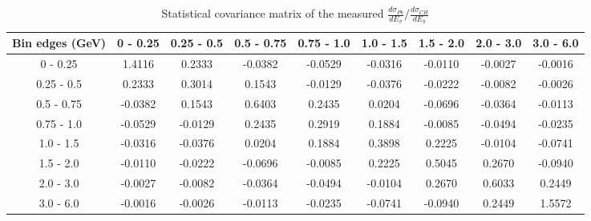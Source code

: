 \documentclass[aps,prl,twocolumn,superscriptaddress,nofootinbib]{revtex4-1}
\begin{document}
\begin{table}[h!]
  \centering
  \caption{Statistical covariance matrix of the measured $\frac{d\sigma_{Pb}}{dE_{\pi}}/\frac{d\sigma_{CH}}{dE_{\pi}}$}
    \begin{tabular}{c||cccccccc}
      Bin edges (GeV) & 0 - 0.25 & 0.25 - 0.5 & 0.5 - 0.75 & 0.75 - 1.0 & 1.0 - 1.5 & 1.5 - 2.0 & 2.0 - 3.0 & 3.0 - 6.0 \\
\hline \hline
        0 - 0.25 &  1.4116 &  0.2333 & -0.0382 & -0.0529 & -0.0316 & -0.0110 & -0.0027 & -0.0016 \\
      0.25 - 0.5 &  0.2333 &  0.3014 &  0.1543 & -0.0129 & -0.0376 & -0.0222 & -0.0082 & -0.0026 \\
      0.5 - 0.75 & -0.0382 &  0.1543 &  0.6403 &  0.2435 &  0.0204 & -0.0696 & -0.0364 & -0.0113 \\
      0.75 - 1.0 & -0.0529 & -0.0129 &  0.2435 &  0.2919 &  0.1884 & -0.0085 & -0.0494 & -0.0235 \\
       1.0 - 1.5 & -0.0316 & -0.0376 &  0.0204 &  0.1884 &  0.3898 &  0.2225 & -0.0104 & -0.0741 \\
       1.5 - 2.0 & -0.0110 & -0.0222 & -0.0696 & -0.0085 &  0.2225 &  0.5045 &  0.2670 & -0.0940 \\
       2.0 - 3.0 & -0.0027 & -0.0082 & -0.0364 & -0.0494 & -0.0104 &  0.2670 &  0.6033 &  0.2449 \\
       3.0 - 6.0 & -0.0016 & -0.0026 & -0.0113 & -0.0235 & -0.0741 & -0.0940 &  0.2449 &  1.5572 \\
    \end{tabular}
  \label{tablecov:Pb_Statistical_Epi}
\end{table}
\end{document}
